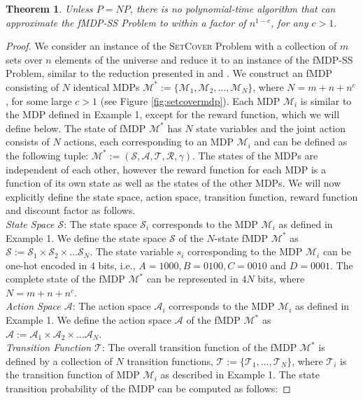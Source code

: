 \documentclass[twocolumn]{autart}    %
\newtheorem{theorem}{Theorem}
\begin{document}
\begin{theorem} \label{thm1} Unless $P=NP$, there is no polynomial-time algorithm that can approximate the fMDP-SS Problem to within a factor of $n^{1-c}$, for any $c > 1$.
\end{theorem}
\begin{proof}
    We consider an instance of the \textsc{SetCover} Problem with a collection of $m$ sets over $n$ elements of the universe and reduce it to an instance of the fMDP-SS Problem, similar to the reduction presented in \cite{kempe2003maximizing} and \cite{schoenebeck2019beyond}. We construct an fMDP consisting of $N$ identical MDPs $\mathcal{M}^* := \{ \mathcal{M}_1, \mathcal{M}_2, \hdots, \mathcal{M}_N \}$, where $N = m+ n +n^c$, for some large $c>1$ (see Figure \ref{fig:setcovermdp}). Each MDP $\mathcal{M}_i$ is similar to the MDP defined in Example 1, except for the reward function, which we will define below. The state of fMDP $\mathcal{M}^*$ has $N$ state variables and the joint action consists of $N$ actions, each corresponding to an MDP $\mathcal{M}_i$ and can be defined as the following tuple: $\mathcal{M}^* :=(\mathcal{S},\mathcal{A}, \mathcal{T}, \mathcal{R},  \gamma)$. The states of the MDPs are independent of each other, however the reward function for each MDP is a function of its own state as well as the states of the other MDPs. We will now explicitly define the state space, action space, transition function, reward function and discount factor as follows. \\
    \textit{State Space $\mathcal{S}$}: The state space $\mathcal{S}_i$ corresponds to the MDP $\mathcal{M}_i$ as defined in Example 1. We define the state space $\mathcal{S}$ of the $N$-state fMDP $\mathcal{M}^*$ as
$
 \mathcal{S} := \mathcal{S}_1 \times \mathcal{S}_2 \times \hdots \mathcal{S}_N. $
The state variable $s_i$ corresponding to the MDP $\mathcal{M}_i$ can be one-hot encoded in $4$ bits, i.e., $A = 1000, B = 0100, C = 0010$ and $D = 0001$. The complete state of the fMDP $\mathcal{M}^*$ can be represented in $4N$ bits, where $N=m+n+n^c$.\\
\textit{Action Space $\mathcal{A}$}: The  action space $ \mathcal{A}_i$ corresponds to the MDP $\mathcal{M}_i$ as defined in Example 1. We define the action space $\mathcal{A}$ of the fMDP $\mathcal{M}^*$ as 
   $\mathcal{A} := \mathcal{A}_1 \times \mathcal{A}_2 \times \hdots \mathcal{A}_N.$\\
\textit{Transition Function $\mathcal{T}$}: The overall transition function of the fMDP $\mathcal{M}^*$ is defined by a collection of $N$ transition functions, $\mathcal{T}:= \{ \mathcal{T}_1, \hdots, \mathcal{T}_N \}$, where $\mathcal{T}_i$ is the transition function of MDP $\mathcal{M}_i$ as described in Example 1. The state transition probability of the fMDP can be computed as follows: 

\end{proof}
\end{document}

